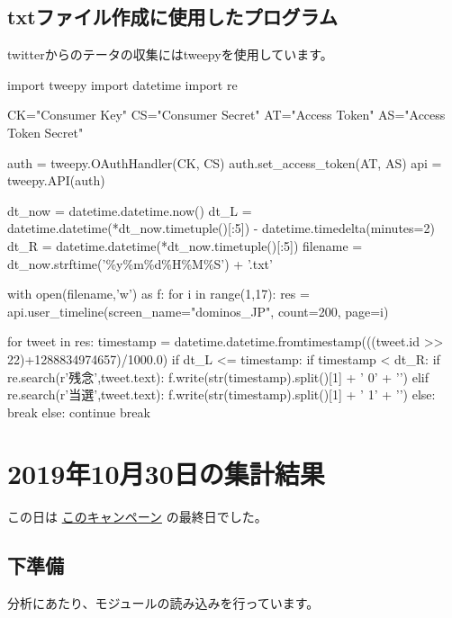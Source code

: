 \subsection{txtファイル作成に使用したプログラム}
\par twitterからのテータの収集にはtweepyを使用しています。
\begin{markdownCodeCell}[escapechar=~]
import tweepy
import datetime
import re
 
 
CK="Consumer Key"
CS="Consumer Secret"
AT="Access Token"
AS="Access Token Secret"
 
 
auth = tweepy.OAuthHandler(CK, CS)
auth.set_access_token(AT, AS)
api = tweepy.API(auth)
 
 
dt_now = datetime.datetime.now()
dt_L = datetime.datetime(*dt_now.timetuple()[:5]) - datetime.timedelta(minutes=2)
dt_R = datetime.datetime(*dt_now.timetuple()[:5])
filename = dt_now.strftime('\%y\%m\%d\%H\%M\%S') + '.txt'
 
 
with open(filename,'w') as f:
    for i in range(1,17):
        res = api.user_timeline(screen_name="dominos_JP", count=200, page=i)
 
 
        for tweet in res:
            timestamp = datetime.datetime.fromtimestamp(((tweet.id >> 22)+1288834974657)/1000.0)
            if dt_L <= timestamp:
                if timestamp < dt_R:
                    if re.search(r'残念',tweet.text):
                        f.write(str(timestamp).split()[1] + ' 0' + '\n')
                    elif re.search(r'当選',tweet.text):
                        f.write(str(timestamp).split()[1] + ' 1' + '\n')
            else:
                break
        else:
            continue
        break
 
 

\end{markdownCodeCell}\section{2019年10月30日の集計結果}
\par この日は \href{https://twitter.com/dominos\_JP/status/1188213772197990402?ref\_src=twsrc\%5Etfw}{このキャンペーン} の最終日でした。
\subsection{下準備}
\par 分析にあたり、モジュールの読み込みを行っています。

